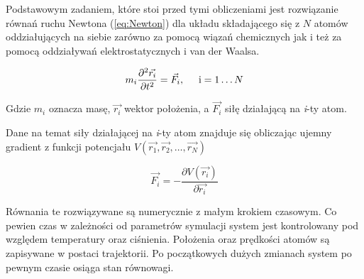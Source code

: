 Podstawowym zadaniem, które stoi przed tymi obliczeniami jest rozwiązanie równań ruchu Newtona (\ref{eq:Newton}) dla układu składającego się z $N$ atomów oddziałujących na siebie zarówno za pomocą wiązań chemicznych jak i też za pomocą oddziaływań elektrostatycznych i van der Waalsa.

\begin{equation}m_{i}\frac{\partial ^{2}\vec{r_{i}}}{\partial t^{2}} = \vec{F_{i}}, \hspace*{0.5cm} \text{i}= 1 \ldots N \label{eq:Newton}\end{equation}

Gdzie $m_{i}$ oznacza masę, $\vec{r_{i}}$ wektor położenia, a $\vec{F_{i}}$ siłę działającą na \textit{i}-ty atom.

Dane na temat siły działającej na \textit{i}-ty atom znajduje się obliczając ujemny gradient z funkcji potencjału $V(\vec{r_{1}}, \vec{r_{2}}, \ldots, \vec{r_{N}})$

\begin{equation} \vec{F_{i}} = - \frac{\partial V(\vec{r_{i}})}{\partial \vec{r_{i}}} \end{equation}

Równania te rozwiązywane są numerycznie z małym krokiem czasowym. Co pewien czas w zależności od parametrów symulacji system jest kontrolowany pod względem temperatury oraz ciśnienia. Położenia oraz prędkości atomów są zapisywane w postaci trajektorii. Po początkowych dużych zmianach system po pewnym czasie osiąga stan równowagi. 

